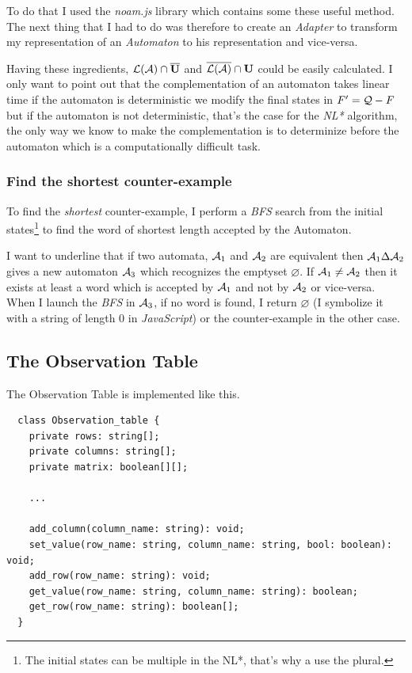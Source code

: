 To do that I used the \textit{noam.js} library which contains some these useful method. The next thing that I had to do was therefore to create an \textit{Adapter} to transform my representation of an \textit{Automaton} to his representation and vice-versa.

Having these ingredients, $\mathcal{L}(\mathcal{A}) \cap \overline{\mathbf{U}}$ and $\overline{\mathcal{L}(\mathcal{A})} \cap \mathbf{U}$ could be easily calculated. I only want to point out that the complementation of an automaton takes linear time if the automaton is deterministic we modify the final states in $F' = \mathcal{Q} - F$ but if the automaton is not deterministic, that's the case for the \textit{NL*} algorithm, the only way we know to make the complementation is to determinize before the automaton which is a computationally difficult task.

\subsubsection{Find the shortest counter-example}
To find the \textit{shortest} counter-example, I perform a \textit{BFS} search from the initial states\footnote{The initial states can be multiple in the NL*, that's why a use the plural.} to find the word of shortest length accepted by the Automaton.

I want to underline that if two automata, $\mathcal{A}_1$ and $\mathcal{A}_2$ are equivalent then $\mathcal{A}_1 \Delta \mathcal{A}_2$ gives a new automaton $\mathcal{A}_3$ which recognizes the emptyset $\varnothing$. If $\mathcal{\mathcal{A}}_1 \neq \mathcal{\mathcal{A}}_2$ then it exists at least a word which is accepted by $\mathcal{A}_1$ and not by $\mathcal{A}_2$ or vice-versa. When I launch the \textit{BFS} in $\mathcal{A}_3$, if no word is found, I return $\varnothing$ (I symbolize it with a string of length 0 in \textit{JavaScript}) or the counter-example in the other case.

\subsection{The Observation Table}
The Observation Table is implemented like this.

\begin{verbatim}
  class Observation_table {
    private rows: string[];
    private columns: string[];
    private matrix: boolean[][];

    ...
  
    add_column(column_name: string): void;
    set_value(row_name: string, column_name: string, bool: boolean): void;
    add_row(row_name: string): void;
    get_value(row_name: string, column_name: string): boolean;
    get_row(row_name: string): boolean[];
  }
  \end{verbatim}

